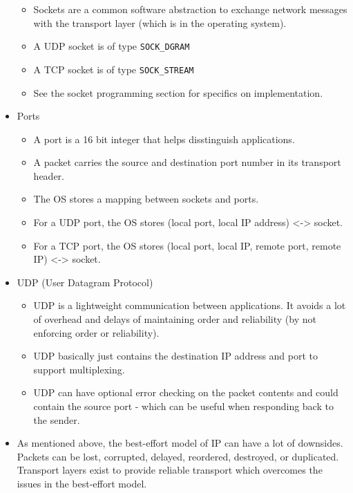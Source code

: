 \begin{itemize}
  \begin{itemize}
  \tightlist
  \item
    Sockets are a common software abstraction to exchange network
    messages with the transport layer (which is in the operating
    system).
  \item
    A UDP socket is of type \texttt{SOCK\_DGRAM}
  \item
    A TCP socket is of type \texttt{SOCK\_STREAM}
  \item
    See the socket programming section for specifics on implementation.
  \end{itemize}
\item
  Ports

  \begin{itemize}
  \tightlist
  \item
    A port is a 16 bit integer that helps disstinguish applications.
  \item
    A packet carries the source and destination port number in its
    transport header.
  \item
    The OS stores a mapping between sockets and ports.
  \item
    For a UDP port, the OS stores (local port, local IP address)
    \textless{}-\textgreater{} socket.
  \item
    For a TCP port, the OS stores (local port, local IP, remote port,
    remote IP) \textless{}-\textgreater{} socket.
  \end{itemize}
\item
  UDP (User Datagram Protocol)

  \begin{itemize}
  \tightlist
  \item
    UDP is a lightweight communication between applications. It avoids a
    lot of overhead and delays of maintaining order and reliability (by
    not enforcing order or reliability).
  \item
    UDP basically just contains the destination IP address and port to
    support multiplexing.
  \item
    UDP can have optional error checking on the packet contents and
    could contain the source port - which can be useful when responding
    back to the sender.
  \end{itemize}
\item
  As mentioned above, the best-effort model of IP can have a lot of
  downsides. Packets can be lost, corrupted, delayed, reordered,
  destroyed, or duplicated. Transport layers exist to provide reliable
  transport which overcomes the issues in the best-effort model.


\end{itemize}
